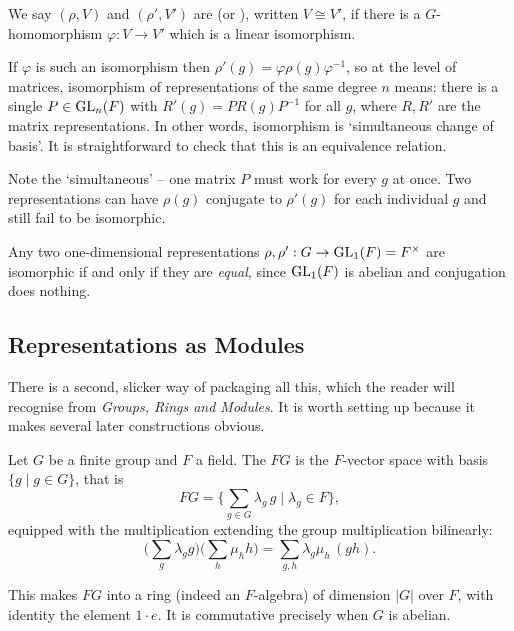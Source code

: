 \documentclass[a4paper]{scrartcl}
\begin{document}
\begin{definition}
	We say $(\rho, V)$ and $(\rho', V')$ are  (or ), written $V \cong V'$, if there is a $G$-homomorphism $\varphi : V \to V'$ which is a linear isomorphism.
\end{definition}

If $\varphi$ is such an isomorphism then $\rho'(g) = \varphi \rho(g) \varphi^{-1}$, so at the level of matrices, isomorphism of representations of the same degree $n$ means: there is a single $P \in \operatorname{GL}_n(F)$ with $R'(g) = P R(g) P^{-1}$ for all $g$, where $R, R'$ are the matrix representations. In other words, isomorphism is `simultaneous change of basis'. It is straightforward to check that this is an equivalence relation.

\begin{remark}
	Note the `simultaneous' -- one matrix $P$ must work for every $g$ at once. Two representations can have $\rho(g)$ conjugate to $\rho'(g)$ for each individual $g$ and still fail to be isomorphic.
\end{remark}

\begin{example}
	Any two one-dimensional representations $\rho, \rho' : G \to \operatorname{GL}_1(F) = F^\times$ are isomorphic if and only if they are \emph{equal}, since $\operatorname{GL}_1(F)$ is abelian and conjugation does nothing.
\end{example}

\subsection{Representations as Modules}

There is a second, slicker way of packaging all this, which the reader will recognise from \emph{Groups, Rings and Modules}. It is worth setting up because it makes several later constructions obvious.

\begin{definition}
	Let $G$ be a finite group and $F$ a field. The  $FG$ is the $F$-vector space with basis $\{ g \mid g \in G\}$, that is
	$$FG = \Big\{ \sum_{g \in G} \lambda_g \, g \; \Big| \; \lambda_g \in F \Big\},$$
	equipped with the multiplication extending the group multiplication bilinearly:
	$$\Big(\sum_g \lambda_g g\Big)\Big(\sum_h \mu_h h\Big) = \sum_{g,h} \lambda_g \mu_h \, (gh).$$
\end{definition}

This makes $FG$ into a ring (indeed an $F$-algebra) of dimension $|G|$ over $F$, with identity the element $1 \cdot e$. It is commutative precisely when $G$ is abelian.
\end{document}
